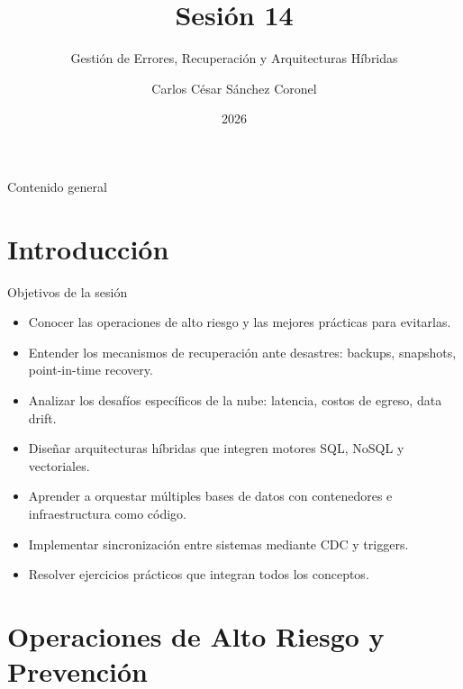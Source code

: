 \documentclass[aspectratio=169, 10pt, xcolor=table]{beamer}
\title[SESIÓN 14 BBDD]{\textbf{Sesión 14}}
\subtitle{Gestión de Errores, Recuperación y Arquitecturas Híbridas}
\author[Prof. C. Sánchez]{Carlos César Sánchez Coronel}
\institute{\textbf{BASES DE DATOS}}
\date{2026}
\begin{document}

\begin{frame}
    \titlepage
\end{frame}

\begin{frame}{Contenido general}
    \tableofcontents
\end{frame}

\section{Introducción}

\begin{frame}{Objetivos de la sesión}
    \begin{itemize}
        \item Conocer las operaciones de alto riesgo y las mejores prácticas para evitarlas.
        \item Entender los mecanismos de recuperación ante desastres: backups, snapshots, point-in-time recovery.
        \item Analizar los desafíos específicos de la nube: latencia, costos de egreso, data drift.
        \item Diseñar arquitecturas híbridas que integren motores SQL, NoSQL y vectoriales.
        \item Aprender a orquestar múltiples bases de datos con contenedores e infraestructura como código.
        \item Implementar sincronización entre sistemas mediante CDC y triggers.
        \item Resolver ejercicios prácticos que integran todos los conceptos.
    \end{itemize}
\end{frame}

\section{Operaciones de Alto Riesgo y Prevención}
\end{document}
